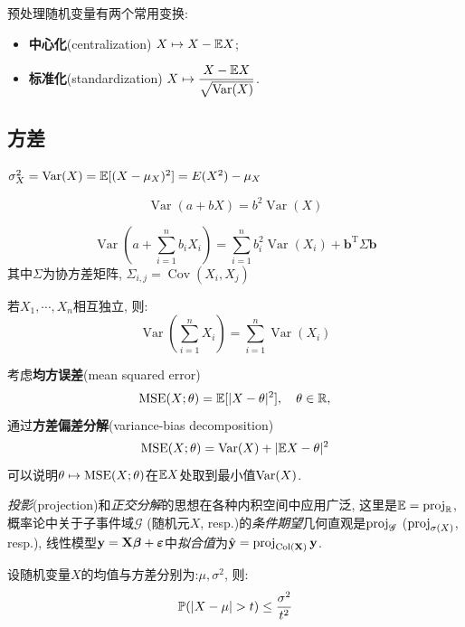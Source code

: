 预处理随机变量有两个常用变换:
\begin{itemize}
    \item \textbf{中心化}(centralization) $X \mapsto X-\E{X}$;
    \item \textbf{标准化}(standardization) $X \mapsto \dfrac{X-\E{X}}{\sqrt{\Var(X)}}$.
\end{itemize}

\subsection{方差}

\begin{theorem}
    $\sigma^2_X=\operatorname{Var}(X)=\E[(X-\mu_X)^2]=E(X^2)-\mu_X$
\end{theorem}

\begin{theorem}
    \[ \operatorname{Var}(a+bX)=b^2\operatorname{Var}(X) \]
\end{theorem}

\begin{theorem}
    \[ \operatorname{Var}(a+\sum_{i=1}^n b_i X_i)=\sum_{i=1}^n b_i^2 \operatorname{Var}(X_i)+\mathbf{b}^{\mathrm{T}} \Sigma \mathbf{b}\]
    其中$\Sigma$为协方差矩阵, $\Sigma_{i,j}=\operatorname{Cov}(X_i,X_j)$
\end{theorem}

\begin{theorem}
    若$X_1,\cdots ,X_n$相互独立, 则:
    \[ \operatorname{Var}(\sum_{i=1}^n X_i)=\sum_{i=1}^n\operatorname{Var}( X_i) \]
\end{theorem}

考虑\textbf{均方误差}(mean squared error)
\[ \MSE(X;\theta) = \E[|X-\theta|^{2}], \quad \theta\in\R, \]
通过\textbf{方差偏差分解}(variance-bias decomposition)
\[ \MSE(X;\theta) = \Var(X) + |\E{X}-\theta|^{2} \]
可以说明$\theta\mapsto\MSE(X;\theta)$在$\E{X}$处取到最小值$\Var(X)$.

\emph{投影}(projection)和\emph{正交分解}的思想在各种内积空间中应用广泛, 这里是$\E = \proj{}{\R}$, 概率论中关于子事件域$\mathscr{G}$ (随机元$X$, resp.)的\emph{条件期望}几何直观是$\proj{}{\mathscr{G}}$ ($\proj{}{\sigma(X)}$, resp.), 线性模型$\mathbf{y} = \mathbf{X}\bm{\beta} + \bm{\e}$中\emph{拟合值}为$\hat{\mathbf{y}} = \proj{\mathbf{y}}{\operatorname{Col}(\mathbf{X})}$.

\begin{theorem}[Chebyshev不等式]
    设随机变量$X$的均值与方差分别为:$\mu, \sigma^2$, 则:
    \[ \P(\left| X-\mu \right| >t)\le \frac{\sigma^{2}}{t^{2}} \]
\end{theorem}

